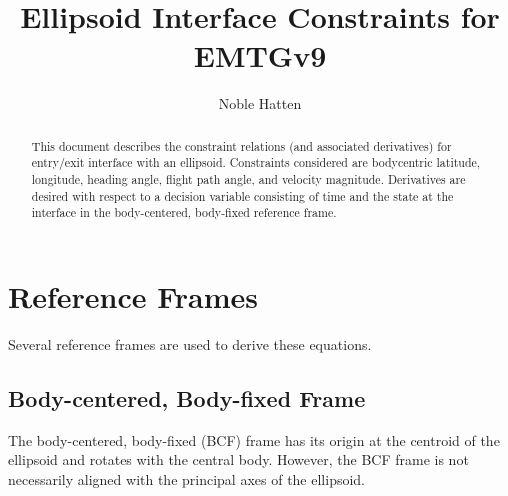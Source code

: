 \documentclass[]{article}
\title{Ellipsoid Interface Constraints for EMTGv9}
\author{Noble Hatten}
\begin{document}
\maketitle

\begin{abstract}
	This document describes the constraint relations (and associated derivatives) for entry/exit interface with an ellipsoid. Constraints considered are bodycentric latitude, longitude, heading angle, flight path angle, and velocity magnitude. Derivatives are desired with respect to a decision variable consisting of time and the state at the interface in the body-centered, body-fixed reference frame. 

\end{abstract}

\tableofcontents

\printnomenclature

\section{Reference Frames}
\label{sec:frames}


Several reference frames are used to derive these equations.

\subsection{Body-centered, Body-fixed Frame}

The body-centered, body-fixed (BCF) frame has its origin at the centroid of the ellipsoid and rotates with the central body. However, the BCF frame is not necessarily aligned with the principal axes of the ellipsoid.
\end{document}
